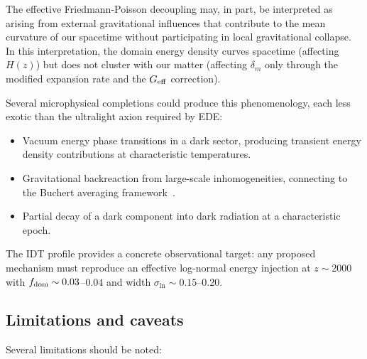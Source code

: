 \documentclass[aps,prd,twocolumn,superscriptaddress,nofootinbib]{revtex4-2}
\newcommand{\fdom}{f_{\rm dom}}
\newcommand{\sln}{\sigma_{\ln}}
\newcommand{\Geff}{G_{\rm eff}}
\begin{document}
The effective Friedmann-Poisson decoupling may, in part, be
interpreted as arising from external gravitational influences
that contribute to the mean curvature of our spacetime without
participating in local gravitational collapse. In this
interpretation, the domain energy density curves spacetime
(affecting $H(z)$) but does not cluster with our matter (affecting
$\delta_m$ only through the modified expansion rate and the
$\Geff$ correction).

Several microphysical completions could produce this
phenomenology, each less exotic than the ultralight axion
required by EDE:
\begin{itemize}
\item Vacuum energy phase transitions in a dark sector,
producing transient energy density contributions at
characteristic temperatures.
\item Gravitational backreaction from large-scale
inhomogeneities, connecting to the Buchert averaging
framework~\cite{Buchert2000}.
\item Partial decay of a dark component into dark radiation
at a characteristic epoch.
\end{itemize}

The IDT profile provides a concrete observational target: any
proposed mechanism must reproduce an effective log-normal energy
injection at $z \sim 2000$ with $\fdom \sim 0.03$--$0.04$ and
width $\sln \sim 0.15$--$0.20$.

\subsection{Limitations and caveats}

Several limitations should be noted:
\end{document}
